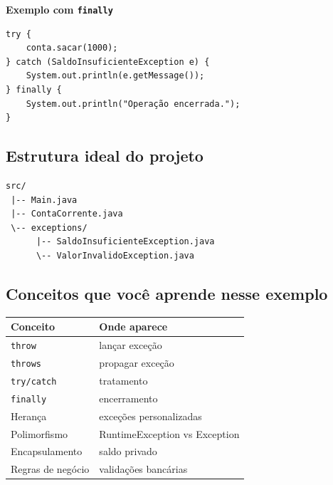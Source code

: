 \documentclass[12pt,a4paper]{article}
\begin{document}
\textbf{Exemplo com \texttt{finally}}
\begin{lstlisting}
try {
    conta.sacar(1000);
} catch (SaldoInsuficienteException e) {
    System.out.println(e.getMessage());
} finally {
    System.out.println("Operação encerrada.");
}
\end{lstlisting}

\subsection*{Estrutura ideal do projeto}
\begin{verbatim}
src/
 |-- Main.java
 |-- ContaCorrente.java
 \-- exceptions/
      |-- SaldoInsuficienteException.java
      \-- ValorInvalidoException.java
\end{verbatim}

\subsection*{Conceitos que você aprende nesse exemplo}
\begin{table}[h]
\centering
\begin{tabular}{|l|l|}
\hline
\textbf{Conceito} & \textbf{Onde aparece} \\
\hline
\texttt{throw} & lançar exceção \\
\texttt{throws} & propagar exceção \\
\texttt{try/catch} & tratamento \\
\texttt{finally} & encerramento \\
Herança & exceções personalizadas \\
Polimorfismo & RuntimeException vs Exception \\
Encapsulamento & saldo privado \\
Regras de negócio & validações bancárias \\
\hline
\end{tabular}
\end{table}
\end{document}
